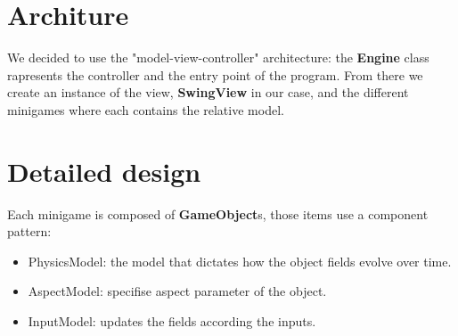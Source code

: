 \documentclass[a4paper,12pt]{report}
\begin{document}
\section{Architure}
We decided to use the "model-view-controller" architecture: the \textbf{Engine} class rapresents the controller and the entry point of the program.
From there we create an instance of the view, \textbf{SwingView} in our case, and the different minigames where each contains the relative model.
%
\section{Detailed design}
Each minigame is composed of \textbf{GameObject}s, those items use a component pattern:
\begin{itemize}
	\item PhysicsModel: the model that dictates how the object fields evolve over time.
	\item AspectModel: specifise aspect parameter of the object.
	\item InputModel: updates the fields according the inputs.
\end{itemize}
\end{document}
